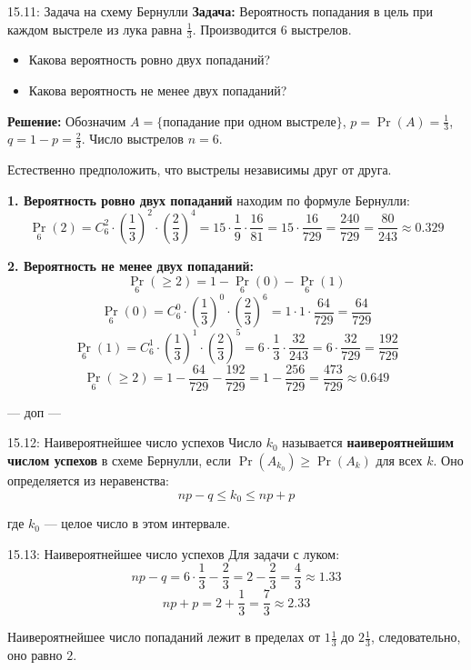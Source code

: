 \documentclass[a4paper,12pt]{article}
\begin{document}
	\begin{examplebox}{15.11: Задача на схему Бернулли}
		\textbf{Задача:} Вероятность попадания в цель при каждом выстреле из лука равна \(\frac{1}{3}\). Производится 6 выстрелов. 
		\begin{itemize}
			\item Какова вероятность ровно двух попаданий?
			\item Какова вероятность не менее двух попаданий?
		\end{itemize}
		
		\textbf{Решение:} Обозначим \(A = \{\text{попадание при одном выстреле}\}\), \(p = \Pr(A) = \frac{1}{3}\), \(q = 1 - p = \frac{2}{3}\). Число выстрелов \(n = 6\).
		
		Естественно предположить, что выстрелы независимы друг от друга.
		
		\textbf{1. Вероятность ровно двух попаданий} находим по формуле Бернулли:
		\[ \Pr_6(2) = C_6^2 \cdot \left(\frac{1}{3}\right)^2 \cdot \left(\frac{2}{3}\right)^4 = 15 \cdot \frac{1}{9} \cdot \frac{16}{81} = 15 \cdot \frac{16}{729} = \frac{240}{729} = \frac{80}{243} \approx 0.329 \]
		
		\textbf{2. Вероятность не менее двух попаданий:}
		\[ \Pr_6(\ge 2) = 1 - \Pr_6(0) - \Pr_6(1) \]
		\[ \Pr_6(0) = C_6^0 \cdot \left(\frac{1}{3}\right)^0 \cdot \left(\frac{2}{3}\right)^6 = 1 \cdot 1 \cdot \frac{64}{729} = \frac{64}{729} \]
		\[ \Pr_6(1) = C_6^1 \cdot \left(\frac{1}{3}\right)^1 \cdot \left(\frac{2}{3}\right)^5 = 6 \cdot \frac{1}{3} \cdot \frac{32}{243} = 6 \cdot \frac{32}{729} = \frac{192}{729} \]
		\[ \Pr_6(\ge 2) = 1 - \frac{64}{729} - \frac{192}{729} = 1 - \frac{256}{729} = \frac{473}{729} \approx 0.649 \]
	\end{examplebox}
	
	--- доп ---
	
	\begin{definitionbox}{15.12: Наивероятнейшее число успехов}
		Число \(k_0\) называется \textbf{наивероятнейшим числом успехов} в схеме Бернулли, если \(\Pr(A_{k_0}) \ge \Pr(A_k)\) для всех \(k\). Оно определяется из неравенства:
		\[ np - q \le k_0 \le np + p \]
		
		где \(k_0\) — целое число в этом интервале.
	\end{definitionbox}
	
	\begin{examplebox}{15.13: Наивероятнейшее число успехов}
		Для задачи с луком:
		\[ np - q = 6 \cdot \frac{1}{3} - \frac{2}{3} = 2 - \frac{2}{3} = \frac{4}{3} \approx 1.33 \]
		\[ np + p = 2 + \frac{1}{3} = \frac{7}{3} \approx 2.33 \]
		
		Наивероятнейшее число попаданий лежит в пределах от \(1\frac{1}{3}\) до \(2\frac{1}{3}\), следовательно, оно равно \(2\).
	\end{examplebox}
	
\end{document}
